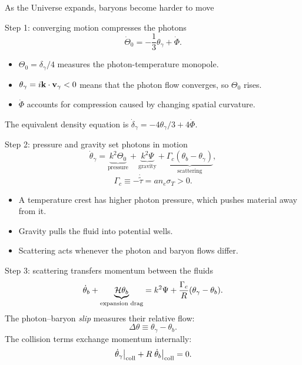 \begin{frame}{As the Universe expands, baryons become harder to move}
\end{frame}

\begin{frame}{Step 1: converging motion compresses the photons}
\[\boxed{\dot\Theta_0=-\frac13\theta_\gamma+\dot\Phi.}\]
\begin{itemize}
\item $\Theta_0=\delta_\gamma/4$ measures the photon-temperature monopole.
\item $\theta_\gamma=i\mathbf k\cdot\mathbf v_\gamma<0$ means that the photon flow converges, so $\Theta_0$ rises.
\item $\dot\Phi$ accounts for compression caused by changing spatial curvature.
\end{itemize}
The equivalent density equation is $\dot\delta_\gamma=-4\theta_\gamma/3+4\dot\Phi$.
\end{frame}

\begin{frame}{Step 2: pressure and gravity set photons in motion}
\[
\dot\theta_\gamma=
\underbrace{k^2\Theta_0}_{\text{pressure}}
+\underbrace{k^2\Psi}_{\text{gravity}}
+\underbrace{\Gamma_c(\theta_b-\theta_\gamma)}_{\text{scattering}},
\]
\[\Gamma_c\equiv-\dot{\widetilde\tau}=a n_e\sigma_T>0.\]
\begin{itemize}
\item A temperature crest has higher photon pressure, which pushes material away from it.
\item Gravity pulls the fluid into potential wells.
\item Scattering acts whenever the photon and baryon flows differ.
\end{itemize}
\end{frame}

\begin{frame}{Step 3: scattering transfers momentum between the fluids}
\vspace{-2mm}
\[
\dot\theta_b+\underbrace{\mathcal H\theta_b}_{\text{expansion drag}}
=k^2\Psi+\frac{\Gamma_c}{R}(\theta_\gamma-\theta_b).
\]
The photon--baryon \emph{slip} measures their relative flow:
\[\boxed{\Delta\theta\equiv\theta_\gamma-\theta_b}.\]
The collision terms exchange momentum internally:
\[\left.\dot\theta_\gamma\right|_{\rm coll}
+R\left.\dot\theta_b\right|_{\rm coll}=0.\]
\end{frame}

